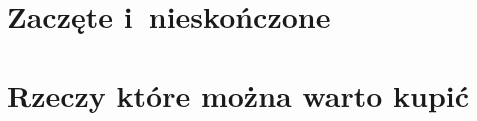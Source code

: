 \documentclass[a4paper,11pt]{article}
\begin{document}
\newpage
\section{Zaczęte i~nieskończone}

\vspace{\spaceTwo}














\newpage
\section{Rzeczy które można warto kupić}

\vspace{\spaceTwo}
\end{document}
